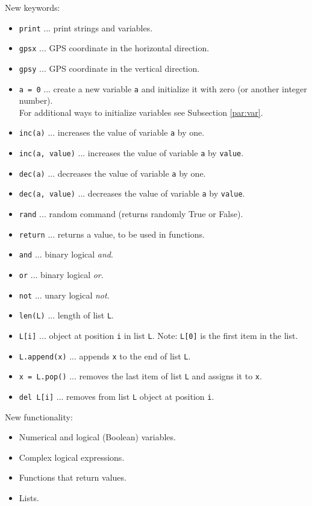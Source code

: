 \documentclass[article,A4,12pt]{llncs}
\begin{document}
New keywords:
\begin{itemize}
\item {\tt print} ... print strings and variables.
\item {\tt gpsx} ... GPS coordinate in the horizontal direction.
\item {\tt gpsy} ... GPS coordinate in the vertical direction.
\item {\tt a = 0} ... create a new variable {\tt a} and initialize it with zero (or another 
      integer number).\\ For additional ways to initialize variables see Subsection \ref{par:var}.
\item {\tt inc(a)} ... increases the value of variable {\tt a} by one.
\item {\tt inc(a, value)} ... increases the value of variable {\tt a} by {\tt value}.
\item {\tt dec(a)} ... decreases the value of variable {\tt a} by one.
\item {\tt dec(a, value)} ... decreases the value of variable {\tt a} by {\tt value}.
\item {\tt rand} ... random command (returns randomly True or False).
\item {\tt return} ... returns a value, to be used in functions.
\item {\tt and} ... binary logical {\em and}.
\item {\tt or} ... binary logical {\em or}.
\item {\tt not} ... unary logical {\em not}.
\item {\tt len(L)} ... length of list {\tt L}.
\item {\tt L[i]} ... object at position {\tt i} in list {\tt L}. Note: {\tt L[0]} is the first item in the list.
\item {\tt L.append(x)} ... appends {\tt x} to the end of list {\tt L}.
\item {\tt x = L.pop()} ... removes the last item of list {\tt L} and assigns it to {\tt x}.
\item {\tt del L[i]} ... removes from list {\tt L} object at position {\tt i}. 
\end{itemize}
New functionality:
\begin{itemize}
\item Numerical and logical (Boolean) variables.
\item Complex logical expressions.
\item Functions that return values.
\item Lists.
\end{itemize}
\end{document}
